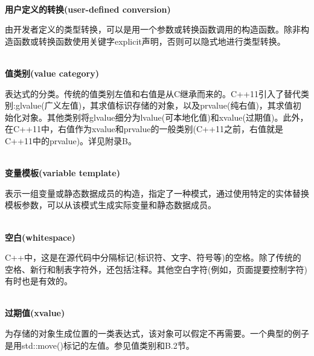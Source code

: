 \hspace*{\fill} \\ %
\noindent
\textbf{用户定义的转换(user-defined conversion)}

由开发者定义的类型转换，可以是用一个参数或转换函数调用的构造函数。除非构造函数或转换函数使用关键字explicit声明，否则可以隐式地进行类型转换。

\hspace*{\fill} \\ %
\noindent
\textbf{值类别(value category)}

表达式的分类。传统的值类别左值和右值是从C继承而来的。C++11引入了替代类别:glvalue(广义左值)，其求值标识存储的对象，以及prvalue(纯右值)，其求值初始化对象。其他类别将glvalue细分为lvalue(可本地化值)和xvalue(过期值)。此外，在C++11中，右值作为xvalue和prvalue的一般类别(C++11之前，右值就是C++11中的prvalue)。详见附录B。

\hspace*{\fill} \\ %
\noindent
\textbf{变量模板(variable template)}

表示一组变量或静态数据成员的构造，指定了一种模式，通过使用特定的实体替换模板参数，可以从该模式生成实际变量和静态数据成员。

\hspace*{\fill} \\ %
\noindent
\textbf{空白(whitespace)}

C++中，这是在源代码中分隔标记(标识符、文字、符号等)的空格。除了传统的空格、新行和制表字符外，还包括注释。其他空白字符(例如，页面提要控制字符)有时也是有效的。

\hspace*{\fill} \\ %
\noindent
\textbf{过期值(xvalue)}

为存储的对象生成位置的一类表达式，该对象可以假定不再需要。一个典型的例子是用std::move()标记的左值。参见值类别和B.2节。




















